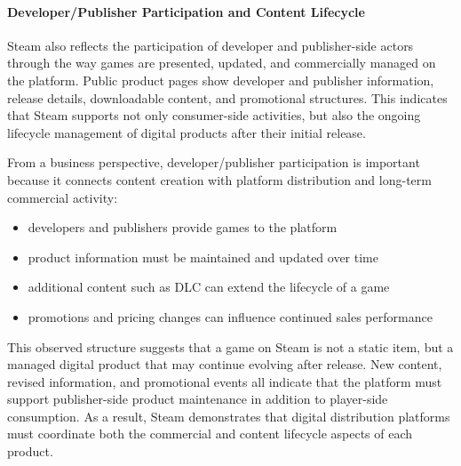 \paragraph{Developer/Publisher Participation and Content Lifecycle}
Steam also reflects the participation of developer and publisher-side actors through the way games are presented, updated, and commercially managed on the platform. Public product pages show developer and publisher information, release details, downloadable content, and promotional structures. This indicates that Steam supports not only consumer-side activities, but also the ongoing lifecycle management of digital products after their initial release.

From a business perspective, developer/publisher participation is important because it connects content creation with platform distribution and long-term commercial activity:
\begin{itemize}
    \item developers and publishers provide games to the platform
    \item product information must be maintained and updated over time
    \item additional content such as DLC can extend the lifecycle of a game
    \item promotions and pricing changes can influence continued sales performance
\end{itemize}

This observed structure suggests that a game on Steam is not a static item, but a managed digital product that may continue evolving after release. New content, revised information, and promotional events all indicate that the platform must support publisher-side product maintenance in addition to player-side consumption. As a result, Steam demonstrates that digital distribution platforms must coordinate both the commercial and content lifecycle aspects of each product.

